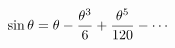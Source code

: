 \documentclass[preview]{standalone}
\begin{document}
\begin{align*}
\special{dvisvgm:raw <g id='unique000'>}\sin\theta = \theta - \frac{\theta^3}{6} + \frac{\theta^5}{120} - \cdots\special{dvisvgm:raw </g>}
\end{align*}
\end{document}
